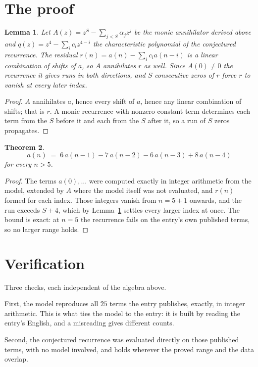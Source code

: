 \documentclass[11pt,a4paper]{article}
\theoremstyle{plain}
\newtheorem{theorem}{Theorem}
\newtheorem{lemma}[theorem]{Lemma}
\theoremstyle{definition}
\begin{document}
\section{The proof}

\begin{lemma}\label{lem:crit}
Let $A(z)=z^S-\sum_{j<S}\alpha_jz^{j}$ be the monic annihilator derived above and
$q(z)=z^{4}-\sum_ic_iz^{4-i}$ the characteristic polynomial of the conjectured
recurrence. The residual $r(n)=a(n)-\sum_ic_ia(n-i)$ is a linear combination of shifts of $a$,
so $A$ annihilates $r$ as well. Since $A(0)\ne0$ the recurrence it gives runs in both
directions, and $S$ consecutive zeros of $r$ force $r$ to vanish at every later index.
\end{lemma}

\begin{proof}
$A$ annihilates $a$, hence every shift of $a$, hence any linear combination of shifts; that is
$r$. A monic recurrence with nonzero constant term determines each term from the $S$ before it
and each from the $S$ after it, so a run of $S$ zeros propagates.
\end{proof}

\begin{theorem}
\[
a(n)\;=\;6\,a(n-1) - 7\,a(n-2) - 6\,a(n-3) + 8\,a(n-4)
\]
for every $n>5$.
\end{theorem}

\begin{proof}
The terms $a(0),\dots$ were computed exactly in integer arithmetic from the model, extended by
$A$ where the model itself was not evaluated, and $r(n)$ formed for each index. Those integers
vanish from $n=5+1$ onwards, and the run exceeds $S+4$, which by
Lemma~\ref{lem:crit} settles every larger index at once. The bound is exact: at $n=5$ the recurrence fails on the entry's own published terms, so no larger range holds.
\end{proof}

\section{Verification}

Three checks, each independent of the algebra above.

First, the model reproduces all $25$ terms the entry publishes, exactly, in integer
arithmetic. This is what ties the model to the entry: it is built by reading the entry's
English, and a misreading gives different counts.

Second, the conjectured recurrence was evaluated directly on those published terms, with no
model involved, and holds wherever the proved range and the data overlap.
\end{document}
